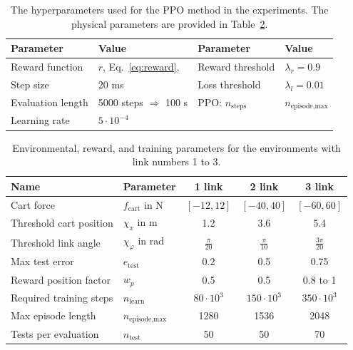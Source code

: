 \begin{table}[h]
	\centering
	\caption{The hyperparameters used for the PPO method in the experiments. The physical parameters are provided in Table~\ref{tab:env_params}.}
	\label{tab:hyperparameters}
	\begin{tabular}{ll|ll}
		\toprule
		\textbf{Parameter}       & \textbf{Value} & \textbf{Parameter}       & \textbf{Value} \\ \midrule
		Reward function          & $r$, Eq.~\ref{eq:reward},  & Reward threshold         & $\lambda_r = 0.9$ \\ 
		Step size                & 20 ms           & Loss threshold           & $\lambda_l = 0.01$ \\ 
		Evaluation length        & 5000 steps $\Rightarrow$ 100 s & PPO: $n_{\text{steps}}$       & $n_{\text{episode,max}}$ \\ 
		Learning rate      & $5 \cdot 10^{-4}$ & & \\ \bottomrule
	\end{tabular}
\end{table}

\begin{table}[h]
	\centering
	\caption{Environmental, reward, and training parameters for the environments with link numbers 1 to 3.}
	\label{tab:env_params}
	\begin{tabular}{l l c c c}
		\toprule
		\textbf{Name} & \textbf{Parameter} & \textbf{1 link} & \textbf{2 link} & \textbf{3 link} \\ \midrule
		Cart force              & $f_{\text{cart}}$ in N         & \([-12, 12]\)   & \([-40, 40]\)   & \([-60, 60]\)  \\ 
		Threshold cart position & $\chi_x$ in m                 & 1.2  & 3.6  & 5.4 \\ 
		Threshold link angle    & $\chi_\varphi$ in rad         & $\frac{\pi}{20}$ & $\frac{\pi}{10}$ & $\frac{3\pi}{20}$ \\
		Max test error          & $e_{\text{test}}$             & 0.2  & 0.5  & 0.75 \\ 
		Reward position factor  & $w_p$                         & 0.5  & 0.5  & 0.8 to 1 \\ 
		Required training steps & $n_{\text{learn}}$            & $80 \cdot 10^3$ & $150 \cdot 10^3$ & $350 \cdot 10^3$ \\ 
		Max episode length      & $n_{\text{episode,max}}$      & 1280 & 1536 & 2048 \\ 
		Tests per evaluation    & $n_{\text{test}}$             & 50   & 50   & 70 \\ 
		\bottomrule
	\end{tabular}
\end{table}

